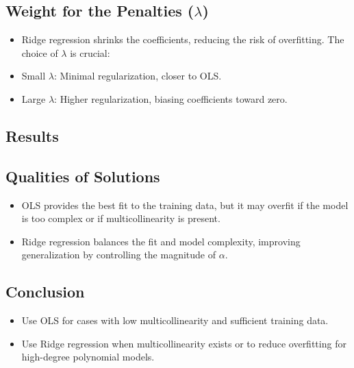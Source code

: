 \subsection*{Weight for the Penalties ($\lambda$)}
\begin{itemize}
    \item Ridge regression shrinks the coefficients, reducing the risk of overfitting. The choice of $\lambda$ is crucial: 
    \item Small $\lambda$: Minimal regularization, closer to OLS.
    \item Large $\lambda$: Higher regularization, biasing coefficients toward zero.
\end{itemize}

\subsection*{Results}


\subsection*{Qualities of Solutions}
\begin{itemize}
    \item OLS provides the best fit to the training data, but it may overfit if the model is too complex or if multicollinearity is present.
    \item Ridge regression balances the fit and model complexity, improving generalization by controlling the magnitude of $\alpha$.
\end{itemize}

\subsection*{Conclusion}
\begin{itemize}
    \item Use OLS for cases with low multicollinearity and sufficient training data.
    \item Use Ridge regression when multicollinearity exists or to reduce overfitting for high-degree polynomial models.
\end{itemize}

